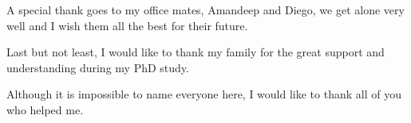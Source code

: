 
A special thank goes to my office mates, Amandeep and Diego, we get alone very well and I wish them all the best for their future.

Last but not least, I would like to thank my family for the great support and understanding during my PhD study.

Although it is impossible to name everyone here, I would like to thank all of you who helped me.


\afterpage{\blankpage}
\newpage




